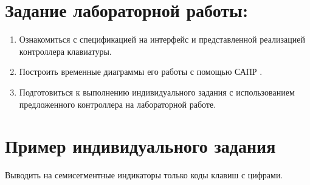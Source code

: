 \section{Задание лабораторной работы:}
\begin{enumerate}[noitemsep,topsep=0pt, after=\vspace{2pt}]

\item{Ознакомиться с спецификацией на интерфейс  и представленной реализацией контроллера клавиатуры.}

\item{Построить временные диаграммы его работы с помощью САПР .}

\item{Подготовиться к выполнению индивидуального задания с использованием предложенного контроллера на лабораторной работе.}

\end{enumerate}

\section{Пример индивидуального задания}

\par{Выводить на семисегментные индикаторы только коды клавиш с цифрами.}



